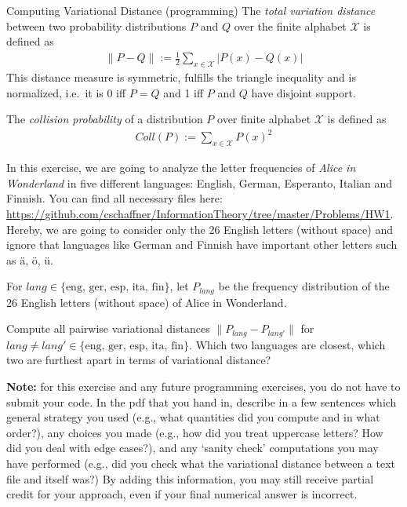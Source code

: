 \documentclass[a4paper,10pt]{article}
\begin{document}


\newcommand{\lang}{\textit{lang}}
\newcommand{\coll}{\textit{coll}}

\begin{nproblem}{8}{Computing Variational Distance (programming)}
The \emph{total variation distance} between two probability distributions $P$ and $Q$
over the finite alphabet $\mathcal{X}$ is defined as 
\begin{align*}
\| P - Q \| := \frac12 \sum_{x \in \mathcal{X} } | P(x) - Q(x) | 
\end{align*}
This distance measure is symmetric, fulfills the triangle inequality and is normalized, i.e.\ it is 0 iff $P=Q$ and 1 iff $P$ and $Q$ have disjoint support.

The \emph{collision probability} of a distribution $P$ over finite alphabet $\mathcal{X}$ is defined as
\begin{align*}
Coll(P) := \sum_{x \in \mathcal{X}} P(x)^2
\end{align*}

In this exercise, we are going to analyze the letter frequencies of \emph{Alice in
  Wonderland} in five different languages: English, German, Esperanto,
Italian and Finnish. You can find all necessary files here: \url{https://github.com/cschaffner/InformationTheory/tree/master/Problems/HW1}. Hereby, we are going to consider only the 26 English letters (without space) and ignore that languages like German and Finnish have important other letters such as {\"a}, {\"o}, {\"u}. 

For $\lang \in \{ \textrm{eng, ger, esp, ita, fin} \}$, let $P_{\lang}$ be the frequency distribution of the 26 English letters (without space) of Alice in Wonderland.

\begin{subproblem}{2}
Compute all pairwise variational distances $\| P_{\lang} - P_{\lang'} \|$ for $\lang \neq \lang' \in \{ \textrm{eng, ger, esp, ita, fin} \}$. Which two languages are closest, which two are furthest apart in terms of variational distance?

\textbf{Note:} for this exercise and any future programming exercises, you do not have to submit your code. In the pdf that you hand in, describe in a few sentences which general strategy you used (e.g., what quantities did you compute and in what order?), any choices you made (e.g., how did you treat uppercase letters? How did you deal with edge cases?), and any `sanity check' computations you may have performed (e.g., did you check what the variational distance between a text file and itself was?) By adding this information, you may still receive partial credit for your approach, even if your final numerical answer is incorrect.
\end{subproblem}
\begin{solution}


\end{solution}
\end{nproblem}
\end{document}
